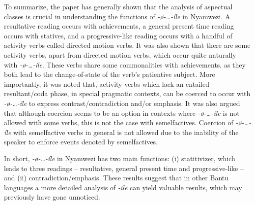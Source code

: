 \documentclass[output=paper,newtxmath,modfonts,nonflat,draftmode]{langsci/langscibook}
\begin{document}
To summarize, the paper has generally shown that the analysis of aspectual classes is crucial in understanding the functions of \textit{-ø}\textit{-…-íle} in Nyamwezi. A resultative reading occurs with achievements, a general present time reading occurs with statives, and a progressive-like reading occurs with a handful of activity verbs called directed motion verbs. It was also shown that there are some activity verbs, apart from directed motion verbs, which occur quite naturally with \textit{-ø}\textit{-…-íle}. These verbs share some commonalities with achievements, as they both lead to the change-of-state of the verb’s patientive subject. More importantly, it was noted that, activity verbs which lack an entailed resultant/coda phase, in special pragmatic contexts, can be coerced to occur with \textit{-ø}\textit{-…-íle} to express contrast/contradiction and/or emphasis. It was also argued that although coercion seems to be an option in contexts where \textit{-ø}\textit{-…-íle} is not allowed with some verbs, this is not the case with semelfactives. Coercion of \textit{-ø}\textit{-…-íle} with semelfactive verbs in general is not allowed due to the inability of the speaker to enforce events denoted by semelfactives. 

In short, \textit{-ø}\textit{-…-íle} in Nyamwezi has two main functions: (i) statitivizer, which leads to three readings -- resultative, general present time and progressive-like -- and (ii) contradiction/emphasis. These results suggest that in other Bantu languages a more detailed analysis of \textit{-íle} can yield valuable results, which may previously have gone unnoticed.  






\end{document}
